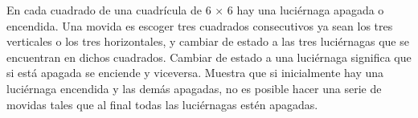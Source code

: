 En cada cuadrado de una cuadrícula de 6 × 6 hay una luciérnaga apagada o encendida.
Una movida es escoger tres cuadrados consecutivos ya sean los tres verticales o los tres
horizontales, y cambiar de estado a las tres luciérnagas que se encuentran en dichos
cuadrados. Cambiar de estado a una luciérnaga significa que si está apagada se enciende
y viceversa.
Muestra que si inicialmente hay una luciérnaga encendida y las demás apagadas, no es
posible hacer una serie de movidas tales que al final todas las luciérnagas estén apagadas.